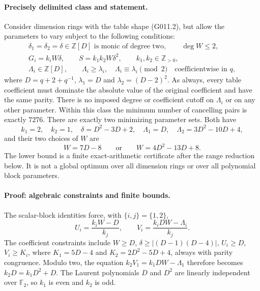 \paragraph{Precisely delimited class and statement.}
Consider dimension rings with the table shape (G011.2), but
allow the parameters to vary subject to the following conditions:
\[
\begin{gathered}
\delta_1=\delta_2=\delta\in\mathbb Z[D]
   \text{ is monic of degree two},\qquad \deg W\le2,\\
G_i=k_iW\delta,\qquad S=k_1k_2W\delta^2,
\qquad k_1,k_2\in\mathbb Z_{>0},\\
\Lambda_i\in\mathbb Z[D],\qquad
\Lambda_i\ge\lambda_i,\quad\Lambda_i\equiv\lambda_i\pmod2
\quad\text{coefficientwise in }q,
\end{gathered}                                              \tag{G019.1}
\]
where $D=q+2+q^{-1}$, $\lambda_1=D$ and
$\lambda_2=(D-2)^2$. As always, every table coefficient
must dominate the absolute value of the original coefficient
and have the same parity. There is no imposed degree or
coefficient cutoff on $\Lambda_i$ or on any other parameter.
Within this class the minimum number of cancelling pairs is
exactly $7276$. There are exactly two minimizing parameter
sets. Both have
\[
k_1=2,\quad k_2=1,\quad
\delta=D^2-3D+2,\quad
\Lambda_1=D,\quad\Lambda_2=3D^2-10D+4,
\]
and their two choices of $W$ are
\[
W=7D-8\qquad\text{or}\qquad W=4D^2-13D+8.
\tag{G019.2}
\]
The lower bound is a finite exact-arithmetic certificate
after the range reduction below. It is not a global optimum
over all dimension rings or over all polynomial block parameters.

\paragraph{Proof: algebraic constraints and finite bounds.}
The scalar-block identities force, with $\{i,j\}=\{1,2\}$,
\[
U_i=\frac{k_iW-D}{k_j},\qquad
V_i=\frac{k_iDW-\Lambda_i}{k_j}.                 \tag{G019.3}
\]
The coefficient constraints include
$W\ge D$, $\delta\ge |(D-1)(D-4)|$, $U_i\ge D$,
$V_i\ge K_i$, where $K_1=5D-4$ and
$K_2=2D^2-5D+4$, always with parity congruence.
Modulo two, the equation $k_2V_1=k_1DW-\Lambda_1$
therefore becomes
$k_2D=k_1D^2+D$. The Laurent polynomials $D$ and $D^2$
are linearly independent over $\mathbb F_2$, so
$k_1$ is even and $k_2$ is odd.

